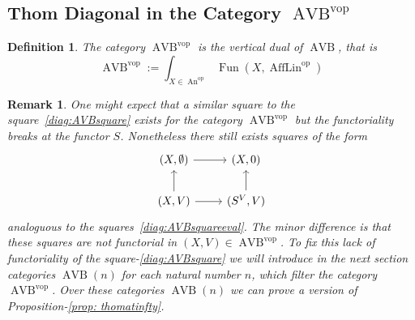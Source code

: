 \documentclass{article}
\newcommand{\op}{\mathrm{op}}
\newcommand{\vop}{\mathrm{vop}}
\DeclareMathOperator{\AVB}{AVB}
\DeclareMathOperator{\An}{An}
\DeclareMathOperator{\Fun}{Fun}
\DeclareMathOperator{\AffLin}{AffLin}
\newtheorem{definition}{Definition}
\newtheorem{remark}{Remark}
\begin{document}


\subsection{Thom Diagonal in the Category $\AVB^\vop$}

\begin{definition}
    The category $\AVB^\vop$ is the vertical dual of $\AVB$, that is 
    \[
      \AVB^\vop := \int_{X \in \An^\op} \Fun(X, \AffLin^\op)  
    \]
\end{definition}

\begin{remark}
    One might expect that a similar square to the square~\ref{diag:AVBsquare} exists 
    for the category $\AVB^\vop$ but the functoriality breaks at the functor $S$.
    Nonetheless there still exists squares of the form 
    \[\begin{tikzcd}
        {(X,\emptyset)} & {(X,0)} \\
        {(X,V)} & {(S^V,V)}
        \arrow[from=2-1, to=1-1]
        \arrow[from=1-1, to=1-2]
        \arrow[from=2-1, to=2-2]
        \arrow[from=2-2, to=1-2]
    \end{tikzcd}\]
    analoguous to the squares~\ref{diag:AVBsquareeval}. The minor difference is that these 
    squares are not functorial in $(X,V) \in \AVB^\vop$.
    To fix this lack of functoriality of the square-\ref{diag:AVBsquare} we will 
    introduce in the next section categories $\AVB(n)$ for each natural number $n$, 
    which filter the category $\AVB^\vop$.
    Over these categories $\AVB(n)$ we can prove a version of Proposition-\ref{prop: thomatinfty}.
\end{remark}
\end{document}
